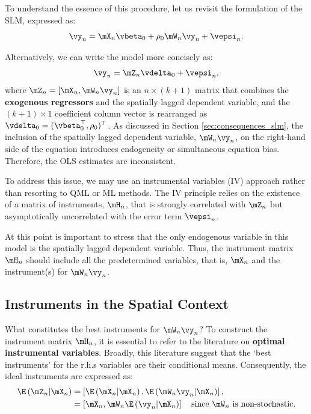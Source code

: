 \documentclass[english,12pt]{book}\usepackage[]{graphicx}\usepackage[]{xcolor}
\begin{document}
To understand the essence of this procedure, let us revisit the formulation of the SLM, expressed as:
\begin{equation*}
  \vy_n =   \mX_n\vbeta_0 + \rho_0\mW_n\vy_n + \vepsi_n.
\end{equation*}

Alternatively, we can write the model more concisely as:
\begin{equation*}
  \vy_n = \mZ_n \vdelta_0 + \vepsi_n,
\end{equation*}
%
where $\mZ_n = \left[\mX_n, \mW_n\vy_n\right]$ is an $n \times (k + 1)$ matrix that combines the \textbf{exogenous regressors} and the spatially lagged dependent variable, and the $(k + 1)\times 1$ coefficient column vector is rearranged as  $\vdelta_0 = (\vbeta^\top_0, \rho_0)^\top$. As discussed in Section \ref{sec:consequences_slm}, the inclusion of the spatially lagged dependent variable, $\mW_n\vy_n$, on the right-hand side of the equation introduces endogeneity or simultaneous equation bias. Therefore, the OLS estimates are inconsistent.

To address this issue, we may use an instrumental variables (IV) approach rather than resorting to QML or ML methods. The IV principle relies on the existence of a matrix of instruments, $\mH_n$, that is strongly correlated with $\mZ_n$ but asymptotically uncorrelated with the error term $\vepsi_n$.

At this point is important to stress that the only endogenous variable in this model is the spatially lagged dependent variable. Thus, the instrument  matrix $\mH_n$ should include all the predetermined variables, that is, $\mX_n$ and the instrument(s) for $\mW_n\vy_n$. 

\subsection{Instruments in the Spatial Context}

What constitutes the best instruments for $\mW_n\vy_n$? To construct the instrument matrix $\mH_n$, it is essential to refer to the literature on \textbf{optimal instrumental variables}. Broadly, this literature suggest that the `best instruments' for the r.h.s variables are their conditional means. Consequently, the ideal instruments are expressed as:
\begin{equation*}
  \begin{aligned}
\E\left(\mZ_n|\mX_n\right) & = \left[\E\left(\mX_n|\mX_n\right), \E\left(\mW_n\vy_n|\mX_n\right)\right], \\
                         & = \left[\mX_n, \mW_n \E\left(\vy_n|\mX_n\right)\right]\quad \mbox{since $\mW_n$ is non-stochastic}.
\end{aligned}
\end{equation*}
\end{document}
